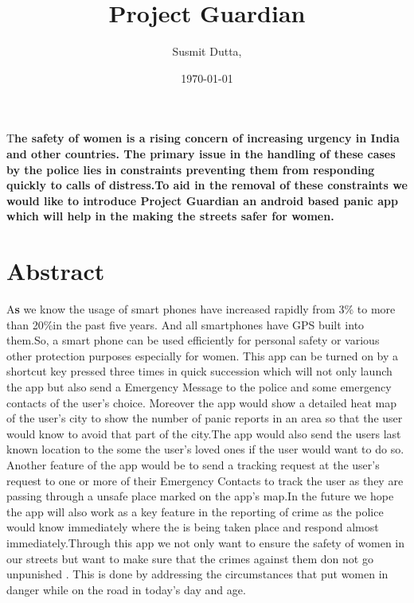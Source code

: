 \documentclass[	DIV=calc,%
							paper=a4,%
							fontsize=12pt,%
							twocolumn]{scrartcl}
\title{ Project Guardian}					%
\author{Susmit Dutta, }											%
\date{\today}																				%
\newcommand{\initial}[1]{%
     \lettrine[lines=3,lhang=0.3,nindent=0em]{
     				\color{DarkGoldenrod}
     				{\textsf{#1}}}{}}
\begin{document}
\setmainfont{Times New Roman}
\maketitle
\thispagestyle{fancy} 			%
\initial{T}\textbf{he safety of women is a rising concern of increasing urgency in India and other countries. The primary issue in the handling of these cases by the police lies in constraints preventing them from responding quickly to calls of distress.To aid in the removal of these constraints we would like to introduce Project Guardian an android based panic app which will help in the making the streets safer for women.}

\section*{Abstract}
\initial{A}\textbf{s} we know the usage of smart phones have increased rapidly from 3\% to more than 20\%in the past five years. And all smartphones have GPS built into them.So, a smart phone can be used efficiently for personal safety or various other protection purposes especially for women. This app can be turned on by a shortcut key pressed three times in quick succession which will not only launch the app but also send a Emergency Message to the police and some emergency contacts of the user's choice. Moreover the app would show a detailed heat map of the user's city to show the number of panic reports in an area so that the user would know to avoid that part of the city.The app would also send the users last known location to the some the user's loved ones if the user would want to do so. Another feature of the app would be to send a tracking request at the user's request to one or more of their Emergency Contacts to track the user as they are passing through a unsafe place marked on the app's map.In the future we hope the app will also work as a key feature in the reporting of crime as the police would know immediately where the is being taken place and respond almost immediately.Through this app we not only want to ensure the safety of women in our streets but want to make sure that the crimes against them don not go unpunished . This is done by addressing the circumstances that put women in danger while on the road in today's day and age.
\end{document}
